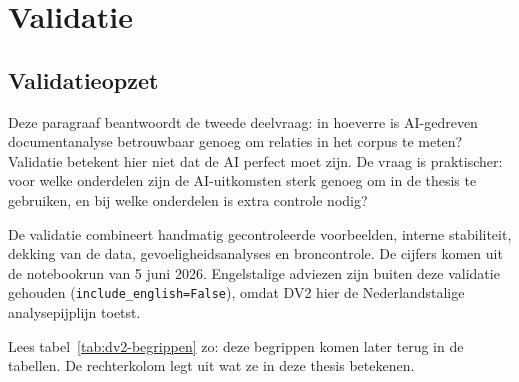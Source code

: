 \section{Validatie}
\subsection{Validatieopzet}
\label{subsec:dv2-validatieopzet}

Deze paragraaf beantwoordt de tweede deelvraag: in hoeverre is AI-gedreven documentanalyse betrouwbaar genoeg om relaties in het corpus te meten? Validatie betekent hier niet dat de AI perfect moet zijn. De vraag is praktischer: voor welke onderdelen zijn de AI-uitkomsten sterk genoeg om in de thesis te gebruiken, en bij welke onderdelen is extra controle nodig?

De validatie combineert handmatig gecontroleerde voorbeelden, interne stabiliteit, dekking van de data, gevoeligheidsanalyses en broncontrole. De cijfers komen uit de notebookrun van 5 juni 2026. Engelstalige adviezen zijn buiten deze validatie gehouden (\texttt{include\_english=False}), omdat DV2 hier de Nederlandstalige analysepijplijn toetst.

Lees tabel~\ref{tab:dv2-begrippen} zo: deze begrippen komen later terug in de tabellen. De rechterkolom legt uit wat ze in deze thesis betekenen.

